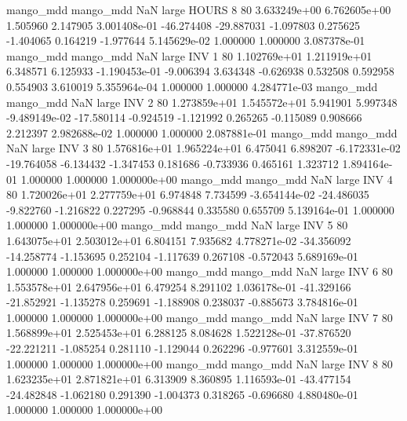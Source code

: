 mango_mdd mango_mdd                   NaN      large    HOURS                 8 80 3.633249e+00   6.762605e+00      1.505960       2.147905  3.001408e-01    -46.274408    -29.887031    -1.097803       0.275625 -1.404065   0.164219    -1.977644   5.145629e-02            1.000000        1.000000        3.087378e-01
mango_mdd mango_mdd                   NaN      large      INV                 1 80 1.102769e+01   1.211919e+01      6.348571       6.125933 -1.190453e-01     -9.006394      3.634348    -0.626938       0.532508  0.592958   0.554903     3.610019   5.355964e-04            1.000000        1.000000        4.284771e-03
mango_mdd mango_mdd                   NaN      large      INV                 2 80 1.273859e+01   1.545572e+01      5.941901       5.997348 -9.489149e-02    -17.580114     -0.924519    -1.121992       0.265265 -0.115089   0.908666     2.212397   2.982688e-02            1.000000        1.000000        2.087881e-01
mango_mdd mango_mdd                   NaN      large      INV                 3 80 1.576816e+01   1.965224e+01      6.475041       6.898207 -6.172331e-02    -19.764058     -6.134432    -1.347453       0.181686 -0.733936   0.465161     1.323712   1.894164e-01            1.000000        1.000000        1.000000e+00
mango_mdd mango_mdd                   NaN      large      INV                 4 80 1.720026e+01   2.277759e+01      6.974848       7.734599 -3.654144e-02    -24.486035     -9.822760    -1.216822       0.227295 -0.968844   0.335580     0.655709   5.139164e-01            1.000000        1.000000        1.000000e+00
mango_mdd mango_mdd                   NaN      large      INV                 5 80 1.643075e+01   2.503012e+01      6.804151       7.935682  4.778271e-02    -34.356092    -14.258774    -1.153695       0.252104 -1.117639   0.267108    -0.572043   5.689169e-01            1.000000        1.000000        1.000000e+00
mango_mdd mango_mdd                   NaN      large      INV                 6 80 1.553578e+01   2.647956e+01      6.479254       8.291102  1.036178e-01    -41.329166    -21.852921    -1.135278       0.259691 -1.188908   0.238037    -0.885673   3.784816e-01            1.000000        1.000000        1.000000e+00
mango_mdd mango_mdd                   NaN      large      INV                 7 80 1.568899e+01   2.525453e+01      6.288125       8.084628  1.522128e-01    -37.876520    -22.221211    -1.085254       0.281110 -1.129044   0.262296    -0.977601   3.312559e-01            1.000000        1.000000        1.000000e+00
mango_mdd mango_mdd                   NaN      large      INV                 8 80 1.623235e+01   2.871821e+01      6.313909       8.360895  1.116593e-01    -43.477154    -24.482848    -1.062180       0.291390 -1.004373   0.318265    -0.696680   4.880480e-01            1.000000        1.000000        1.000000e+00

